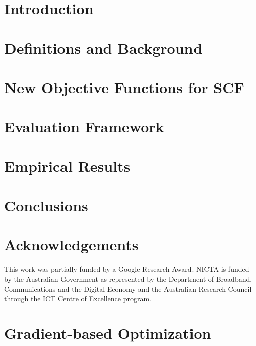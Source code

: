 \documentclass{sig-alternate}
\begin{document}

\section{Introduction}
\label{sec:Introduction}


\section{Definitions and Background}
\label{sec:Background}


\section{New Objective Functions for SCF}
\label{sec:NewObjFuns}


\section{Evaluation Framework}
\label{sec:Evaluation}


\section{Empirical Results}
\label{sec:EmpResults}


\section{Conclusions}
\label{sec:Conclusions}


\section*{Acknowledgements}

This work was partially funded by a Google Research Award.
NICTA is funded by the Australian Government as represented by
the Department of Broadband, Communications and the Digital
Economy and the Australian Research Council through the ICT
Centre of Excellence program.

%



\appendix
\section{Gradient-based Optimization}
\label{app:Derivatives}

\end{document}
